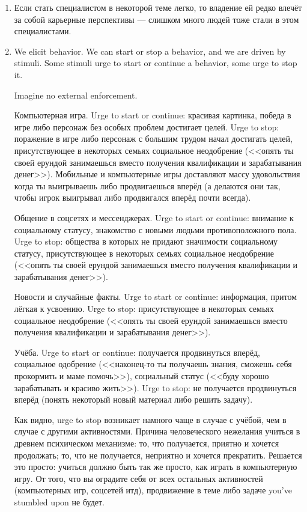 \documentclass[11pt]{article}
\theoremstyle{remark}
\theoremstyle{definition}
\begin{document}
\begin{enumerate}
\item Если стать специалистом в некоторой теме легко, то владение ей редко влечёт за собой карьерные перспективы --- слишком много людей тоже стали в этом специалистами.


\item We elicit behavior. We can start or stop a behavior, and we are driven by stimuli. Some stimuli urge to start or continue a behavior, some urge to stop it.

Imagine no external enforcement.

Компьютерная игра. Urge to start or continue: красивая картинка, победа в игре либо персонаж без особых проблем достигает целей. Urge to stop: поражение в игре либо персонаж с большим трудом начал достигать целей, присутствующее в некоторых семьях социальное неодобрение (<<опять ты своей ерундой занимаешься вместо получения квалификации и зарабатывания денег>>). Мобильные и компьютерные игры доставляют массу удовольствия когда ты выигрываешь либо продвигаешься вперёд (а делаются они так, чтобы игрок выигрывал либо продвигался вперёд почти всегда).

Общение в соцсетях и мессенджерах. Urge to start or continue: внимание к социальному статусу, знакомство с новыми людьми противоположного пола. Urge to stop: общества в которых не придают значимости социальному статусу, присутствующее в некоторых семьях социальное неодобрение (<<опять ты своей ерундой занимаешься вместо получения квалификации и зарабатывания денег>>).

Новости и случайные факты. Urge to start or continue: информация, притом лёгкая к усвоению. Urge to stop: присутствующее в некоторых семьях социальное неодобрение (<<опять ты своей ерундой занимаешься вместо получения квалификации и зарабатывания денег>>).

Учёба. Urge to start or continue: получается продвинуться вперёд, социальное одобрение (<<наконец-то ты получаешь знания, сможешь себя прокормить и маме помочь>>), социальный статус (<<буду хорошо зарабатывать и красиво жить>>). Urge to stop: не получается продвинуться вперёд (понять некоторый новый материал либо решить задачу).



Как видно, urge to stop возникает намного чаще в случае с учёбой, чем в случае с другими активностями. Причина человеческого нежелания учиться в древнем психическом механизме: то, что получается, приятно и хочется продолжать; то, что не получается, неприятно и хочется прекратить. Решается это просто: учиться должно быть так же просто, как играть в компьютерную игру. От того, что вы оградите себя от всех остальных активностей (компьютерных игр, соцсетей итд), продвижение в теме либо задаче you've stumbled upon не будет.




\end{enumerate}
\end{document}
